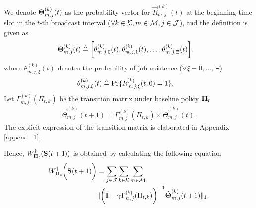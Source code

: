 \begin{lemma}
    We denote $\boldsymbol{\Theta}^{(k)}_{m,j}(t)$ as the probability vector for $\vec{R}_{m,j}^{(k)}(t)$ at the beginning time slot in the $t$-th broadcast interval ($\forall k\in\mathcal{K}, m\in\mathcal{M}, j\in\mathcal{J}$), and the definition is given as
    \begin{align}
        \boldsymbol{\Theta}^{(k)}_{m,j}(t) &\triangleq
        \bigg[ \theta^{(k)}_{m,j,0}(t), \theta^{(k)}_{m,j,1}(t), \dots, \theta^{(k)}_{m,j,\Xi}(t) \bigg],
    \end{align}
    where $\theta^{(k)}_{m,j,\xi}(t)$ denotes the probability of job existence ($\forall \xi=0,\dots,\Xi$)
    \begin{align}
        \theta^{(k)}_{m,j,\xi}(t) &\triangleq \Pr\{R^{(k)}_{m,j,\xi}(t,0) = 1\}.
    \end{align}
    Let ${\Gamma}^{(k)}_{m,j}(\Pi_{t,k})$ be the transition matrix under baseline policy $\boldsymbol{\Pi}_{t}$
    \begin{align}
        \vec{\Theta}_{m,j}^{(k)}(t+1) = {\Gamma}^{(k)}_{m,j}(\Pi_{t,k}) \times \vec{\Theta}_{m,j}^{(k)}(t).
    \end{align}
    The explicit expression of the transition matrix is elaborated in Appendix \ref{append_1}.

    Hence, $W^{\dagger}_{\boldsymbol{\Pi}_{t}}(\mathbf{S}(t+1))$ is obtained by calculating the following equation
    \begin{align}
        W^{\dagger}_{\boldsymbol{\Pi}_{t}}\bigg(\mathbf{S}(t+1)\bigg) &= \sum_{j\in\mathcal{J}}\sum_{k\in\mathcal{K}}\sum_{m\in\mathcal{M}}
        \nonumber\\
        &\lVert
            \bigg( \mathbf{I} - \gamma {\Gamma}^{(k)}_{m,j}(\Pi_{t,k}) \bigg)^{-1} \hat{\boldsymbol{\Theta}}^{(k)}_{m,j}(t+1)
        \|_1.
        \label{w_ap}
    \end{align}
\end{lemma}

